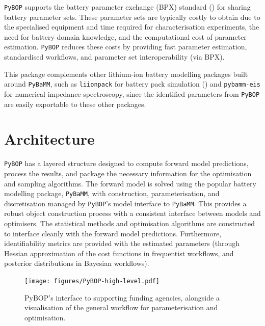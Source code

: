 \documentclass[
]{article}
\begin{document}
\texttt{PyBOP} supports the battery parameter exchange (BPX) standard
() for sharing battery
parameter sets. These parameter sets are typically costly to obtain due
to the specialised equipment and time required for characterisation
experiments, the need for battery domain knowledge, and the
computational cost of parameter estimation. \texttt{PyBOP} reduces these
costs by providing fast parameter estimation, standardised workflows,
and parameter set interoperability (via BPX).

This package complements other lithium-ion battery modelling packages
built around \texttt{PyBaMM}, such as \texttt{liionpack} for battery
pack simulation () and
\texttt{pybamm-eis} for numerical impedance spectroscopy, since the
identified parameters from \texttt{PyBOP} are easily exportable to these
other packages.

\section{Architecture}\label{architecture}

\texttt{PyBOP} has a layered structure designed to compute forward model
predictions, process the results, and package the necessary information
for the optimisation and sampling algorithms. The forward model is
solved using the popular battery modelling package, \texttt{PyBaMM},
with construction, parameterisation, and discretisation managed by
\texttt{PyBOP}'s model interface to \texttt{PyBaMM}. This provides a
robust object construction process with a consistent interface between
models and optimisers. The statistical methods and optimisation
algorithms are constructed to interface cleanly with the forward model
predictions. Furthermore, identifiability metrics are provided with the
estimated parameters (through Hessian approximation of the cost
functions in frequentist workflows, and posterior distributions in
Bayesian workflows).

\begin{figure}
\centering
\texttt{[image: figures/PyBOP-high-level.pdf]}
\caption{PyBOP's interface to supporting funding agencies, alongside a
visualisation of the general workflow for parameterisation and
optimisation. \label{fig:high-level}}
\end{figure}
\end{document}
